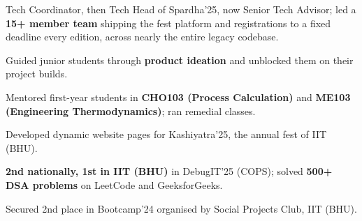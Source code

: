 \documentclass[10pt]{article}
\begin{document}
\begin{rkbody}
\begin{rkitems}
  \item Tech Coordinator, then Tech Head of Spardha'25, now Senior Tech Advisor; led a \textbf{15+ member team} shipping the fest platform and registrations to a fixed deadline every edition, across nearly the entire legacy codebase.
\end{rkitems}
\begin{rkitems}
  \item Guided junior students through \textbf{product ideation} and unblocked them on their project builds.
\end{rkitems}
\begin{rkitems}
  \item Mentored first-year students in \textbf{CHO103 (Process Calculation)} and \textbf{ME103 (Engineering Thermodynamics)}; ran remedial classes.
\end{rkitems}
\begin{rkitems}
  \item Developed dynamic website pages for Kashiyatra'25, the annual fest of IIT (BHU).
\end{rkitems}

\begin{rkitems}
  \item \textbf{2nd nationally, 1st in IIT (BHU)} in DebugIT'25 (COPS); solved \textbf{500+ DSA problems} on LeetCode and GeeksforGeeks.
  \item Secured 2nd place in Bootcamp'24 organised by Social Projects Club, IIT (BHU).
\end{rkitems}

\end{rkbody}
\end{document}
